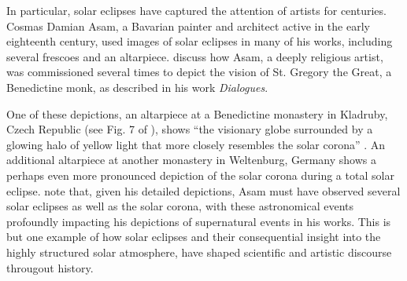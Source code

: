 %
\par In particular, solar eclipses have captured the attention of artists for centuries. Cosmas Damian Asam, a Bavarian painter and architect active in the early eighteenth century, used images of solar eclipses in many of his works, including several frescoes and an altarpiece. \citet{olson_st._2007} discuss how Asam, a deeply religious artist, was commissioned several times to depict the vision of St. Gregory the Great, a Benedictine monk, as described in his work \textit{Dialogues}. 
%
\par One of these depictions, an altarpiece at a Benedictine monastery in Kladruby, Czech Republic (see Fig. 7 of \citet{olson_st._2007}), shows ``the visionary globe surrounded by a glowing halo of yellow light that more closely resembles the solar corona'' \citep{olson_st._2007}. An additional altarpiece at another monastery in Weltenburg, Germany shows a perhaps even more pronounced depiction of the solar corona during a total solar eclipse. \citet{olson_st._2007} note that, given his detailed depictions, Asam must have observed several solar eclipses as well as the solar corona, with these astronomical events profoundly impacting his depictions of supernatural events in his works. This is but one example of how solar eclipses and their consequential insight into the highly structured solar atmosphere, have shaped scientific and artistic discourse througout history.
%
